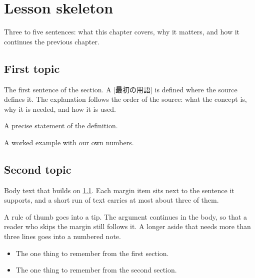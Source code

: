 \documentclass[../main.tex]{subfiles}
\begin{document}
\chapter{Lesson skeleton}

Three to five sentences: what this chapter covers, why it matters, and how it
continues the previous chapter.

\section{First topic}
\label{sec:l02-first}

The first sentence of the section.
A [最初の用語] is defined where the source defines it.
The explanation follows the order of the source: what the concept is, why
it is needed, and how it is used.

\begin{definition}
  \label{def:l02-first}
  A precise statement of the definition.
\end{definition}

\begin{example}
  \label{ex:l02-first}
  A worked example with our own numbers.
\end{example}

\section{Second topic}
\label{sec:l02-second}

Body text that builds on \cref{sec:l02-first}.  Each margin item sits next to the sentence it supports, and a
short run of text carries at most about three of them.

A rule of thumb goes into a tip.  The argument
continues in the body, so that a reader who skips the margin still follows
it.  A longer aside that needs more than three lines goes into a numbered
note.

\begin{keypoint}
  \begin{itemize}
    \item The one thing to remember from the first section.
    \item The one thing to remember from the second section.
  \end{itemize}
\end{keypoint}
\end{document}
